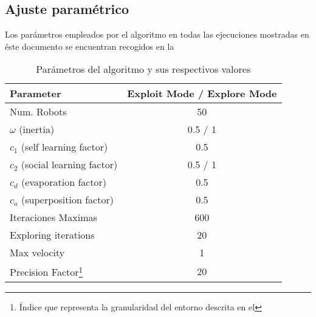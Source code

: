 \newcommand{\prefacnota}{\footnote{
		Índice que representa la granularidad del entorno descrita en el \refcruzada{Apartado}{sec:espacio}
	}}

\subsection{Ajuste paramétrico}
Los parámetros empleados por el algoritmo en todas las ejecuciones mostradas en éste documento se encuentran recogidos en la 
\begin{savenotes}
	\begin{table}[]
	   	\centering
	    \caption{Parámetros del algoritmo y sus respectivos valores}
		\begin{tabular}{|l|c|}
			\hline
			Parameter                      & Exploit Mode / Explore Mode                      \\
			\hline
			Num. Robots                    & 50                                               \\
			$\omega$ (inertia)             & 0.5 / 1                                          \\
			$c_1$ (self learning factor)   & 0.5                                              \\
			$c_2$ (social learning factor) & 0.5 / 1                                          \\
			$c_d$ (evaporation factor)     & 0.5                                              \\
			$c_a$ (superposition factor)   & 0.5                                              \\
			Iteraciones Maximas            & 600                                              \\
			Exploring iterations           & 20                                               \\
			Max velocity                   & 1                                                \\
			Precision Factor\prefacnota    & 20                                               \\ \hline
		\end{tabular}
    	\label{tabla:1}
	\end{table}
\end{savenotes}


